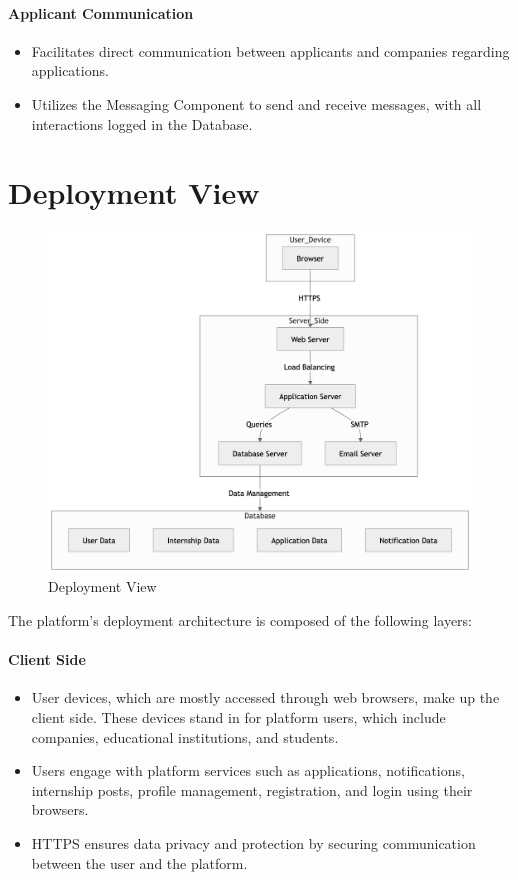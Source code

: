 \paragraph{Applicant Communication}
\begin{itemize}
    \item Facilitates direct communication between applicants and companies regarding applications.
    \item Utilizes the Messaging Component to send and receive messages, with all interactions logged in the Database.
\end{itemize}

\section{Deployment View}
\label{sec:deployment_view}

\begin{figure}[H]
    \begin{center}
        \includegraphics[width=0.82\linewidth]{JhaBhatiaSharma/imagesDD/DeploymentView.png}
        \caption{Deployment View}
        \label{fig:deploymentview}%
    \end{center}
\end{figure}
The platform's deployment architecture is composed of the following layers:

\paragraph{Client Side}
\begin{itemize}
    \item User devices, which are mostly accessed through web browsers, make up the client side. These devices stand in for platform users, which include companies, educational institutions, and students.
    \item Users engage with platform services such as applications, notifications, internship posts, profile management, registration, and login using their browsers.
    \item HTTPS ensures data privacy and protection by securing communication between the user and the platform.
\end{itemize}

